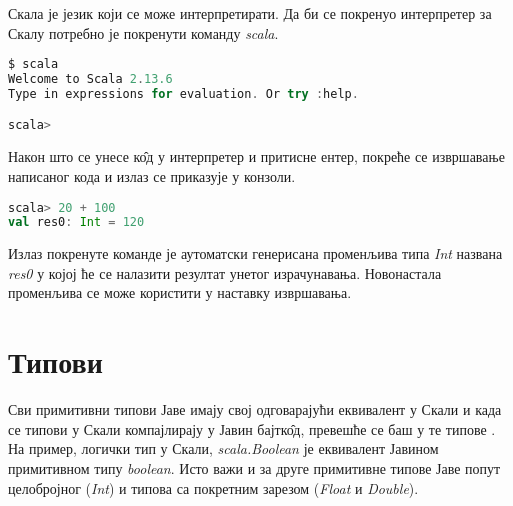 \documentclass[12pt,oneside]{memoir}
\begin{document}
Скала је језик који се може интерпретирати. Да би се покренуо интерпретер за Скалу потребно је покренути команду \textit{scala}.

\begin{lstlisting}[language=Scala, caption={Интерпретер за Скалу}, label={lst:scala_scala_interpreter_example}, basicstyle=\small]
$ scala
Welcome to Scala 2.13.6
Type in expressions for evaluation. Or try :help.

scala>
\end{lstlisting}

Након што се унесе к\^{о}д у интерпретер и притисне ентер, покреће се извршавање написаног кода и излаз се приказује у конзоли.

\begin{lstlisting}[language=Scala, caption={Пример извршавања кода у интерпретеру}, label={lst:scala_interpreter_code_example}, basicstyle=\small]
scala> 20 + 100
val res0: Int = 120
\end{lstlisting}

Излаз покренуте команде је аутоматски генерисана променљива типа \textit{Int} названа \textit{res0} у којој ће се налазити резултат унетог израчунавања. Новонастала променљива се може користити у наставку извршавања.



%

\section{Типови}
\label{sec:scala_tip}

Сви примитивни типови Јаве имају свој одговарајући еквивалент у Скали и када се типови у Скали компајлирају у Јавин бајтк\^{о}д, превешће се баш у те типове \cite{scala_prog}. На пример, логички тип у Скали, \textit{scala.Boolean} је еквивалент Јавином примитивном типу \textit{boolean}. Исто важи и за друге примитивне типове Јаве попут целобројног (\textit{Int}) и типова са покретним зарезом (\textit{Float} и \textit{Double}).
\end{document}

